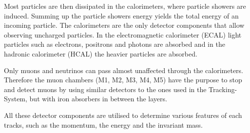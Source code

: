 Most particles are then dissipated in the calorimeters, where particle showers are induced. Summing up the particle showers energy yields the total energy of an incoming particle.
The calorimeters are the only detector components that allow observing uncharged particles. In the electromagnetic calorimeter (ECAL) light particles such as electrons, positrons and photons are absorbed and in the hadronic calorimeter (HCAL) the heavier particles are absorbed.

Only muons and neutrinos can pass almost unaffected through the calorimeters. Therefore the muon chambers (M1, M2, M3, M4, M5) have the purpose to stop and detect muons by using similar detectors to the ones used in the Tracking-System, but with iron absorbers in between the layers.

All these detector components are utilised to determine various features of each tracks, such as the momentum, the energy and the invariant mass.


